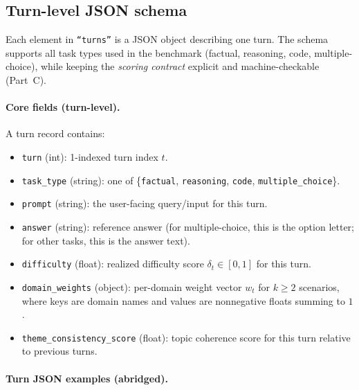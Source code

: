 \subsection{Turn-level JSON schema}
\label{app:schema_turn}

Each element in \texttt{``turns''} is a JSON object describing one turn. The schema supports all task types used in the benchmark (factual, reasoning, code, multiple-choice), while keeping the \emph{scoring contract} explicit and machine-checkable (Part~C).

\paragraph{Core fields (turn-level).}
A turn record contains:
\begin{itemize}
    \item \texttt{turn} (int): 1-indexed turn index $t$.
    \item \texttt{task\_type} (string): one of \{\texttt{factual}, \texttt{reasoning}, \texttt{code}, \texttt{multiple\_choice}\}.
    \item \texttt{prompt} (string): the user-facing query/input for this turn.
    \item \texttt{answer} (string): reference answer (for multiple-choice, this is the option letter; for other tasks, this is the answer text).
    \item \texttt{difficulty} (float): realized difficulty score $\delta_t\in[0,1]$ for this turn.
    \item \texttt{domain\_weights} (object): per-domain weight vector $w_t$ for $k\ge2$ scenarios, where keys are domain names and values are nonnegative floats summing to $1$.
    \item \texttt{theme\_consistency\_score} (float): topic coherence score for this turn relative to previous turns.
\end{itemize}

\paragraph{Turn JSON examples (abridged).}

